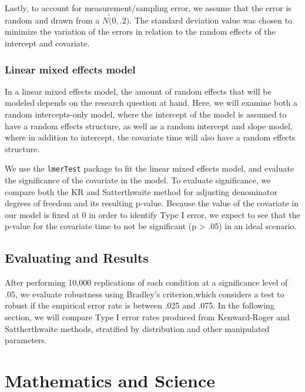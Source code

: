\documentclass[12pt, twoside]{amherstthesis}
\begin{document}
Lastly, to account for measurement/sampling error, we assume that the error is random and drawn from a \(N \tilde (0,.2).\) The standard deviation value was chosen to minimize the variation of the errors in relation to the random effects of the intercept and covariate.

\hypertarget{linear-mixed-effects-model}{%
\subsection{Linear mixed effects model}\label{linear-mixed-effects-model}}

In a linear mixed effects model, the amount of random effects that will be modeled depends on the research question at hand. Here, we will examine both a random intercepts-only model, where the intercept of the model is assumed to have a random effects structure, as well as a random intercept and slope model, where in addition to intercept, the covariate time will also have a random effects structure.

We use the \texttt{lmerTest} package to fit the linear mixed effects model, and evaluate the significance of the covariate in the model. To evaluate significance, we compare both the KR and Satterthwaite method for adjusting denominator degrees of freedom and its resulting p-value. Because the value of the covariate in our model is fixed at 0 in order to identify Type I error, we expect to see that the p-value for the covariate time to not be significant (p \textgreater{} .05) in an ideal scenario.

\hypertarget{evaluating-and-results}{%
\section{Evaluating and Results}\label{evaluating-and-results}}

After performing 10,000 replications of each condition at a significance level of .05, we evaluate robustness using Bradley's criterion,which considers a test to robust if the empirical error rate is between .025 and .075. In the following section, we will compare Type I error rates produced from Kenward-Roger and Sattherthwaite methods, stratified by distribution and other manipulated parameters.

\hypertarget{math-sci}{%
\chapter{Mathematics and Science}\label{math-sci}}
\end{document}
